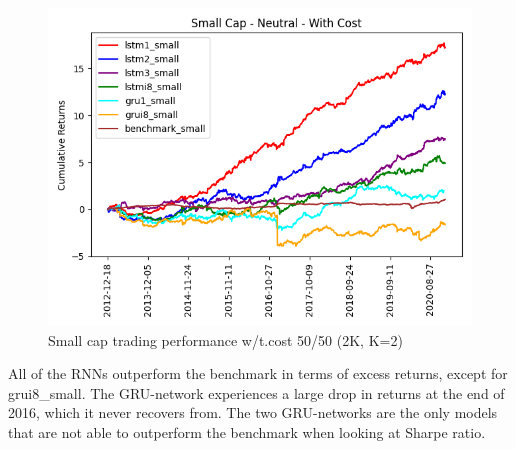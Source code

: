 \begin{figure}[H]
\centering
\includegraphics [scale=0.60,angle=360]{figures/cumulative_small_cap_return_with_cost_n.png}
\caption{Small cap trading performance w/t.cost 50/50 (2K, K=2)}
\label{fig:5050smallc}
\end{figure} 
\indent\newline 
All of the RNNs outperform the benchmark in terms of excess returns, except for grui8\_small. The GRU-network experiences a large drop in returns at the end of 2016, which it never recovers from. The two GRU-networks are the only models that are not able to outperform the benchmark when looking at Sharpe ratio.

